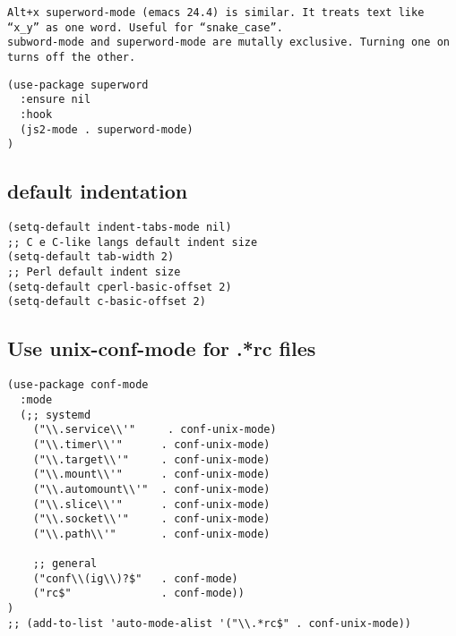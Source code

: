 \documentclass[11pt]{article}
\begin{document}
\begin{verbatim}
Alt+x superword-mode (emacs 24.4) is similar. It treats text like “x_y” as one word. Useful for “snake_case”.
subword-mode and superword-mode are mutally exclusive. Turning one on turns off the other.
\end{verbatim}


\begin{verbatim}
(use-package superword
  :ensure nil
  :hook
  (js2-mode . superword-mode)
)
\end{verbatim}

\subsection*{default indentation}
\label{sec:orgc82118e}
\begin{verbatim}
(setq-default indent-tabs-mode nil)
;; C e C-like langs default indent size
(setq-default tab-width 2)
;; Perl default indent size
(setq-default cperl-basic-offset 2)
(setq-default c-basic-offset 2)
\end{verbatim}

\subsection*{Use unix-conf-mode for .*rc files}
\label{sec:org6a49976}
\begin{verbatim}
(use-package conf-mode
  :mode
  (;; systemd
    ("\\.service\\'"     . conf-unix-mode)
    ("\\.timer\\'"      . conf-unix-mode)
    ("\\.target\\'"     . conf-unix-mode)
    ("\\.mount\\'"      . conf-unix-mode)
    ("\\.automount\\'"  . conf-unix-mode)
    ("\\.slice\\'"      . conf-unix-mode)
    ("\\.socket\\'"     . conf-unix-mode)
    ("\\.path\\'"       . conf-unix-mode)

    ;; general
    ("conf\\(ig\\)?$"   . conf-mode)
    ("rc$"              . conf-mode))
)
;; (add-to-list 'auto-mode-alist '("\\.*rc$" . conf-unix-mode))
\end{verbatim}
\end{document}
